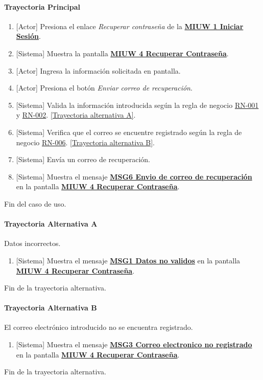 \paragraph{Trayectoria Principal}
	\begin{enumerate}
	    \item {[Actor]} Presiona el enlace \textit{Recuperar contraseña} de la \hyperref[fig:MIUW-1]{\bf MIUW 1 Iniciar Sesión}.
	    \item {[Sistema]} Muestra la pantalla \hyperref[fig:MIUW-4]{\bf MIUW 4 Recuperar Contraseña}.
	    \item {[Actor]} Ingresa la información solicitada en pantalla.
	    \item {[Actor]} Presiona el botón \textit{Enviar correo de recuperación}.
	    \item {[Sistema]} Valida la información introducida según la regla de negocio \hyperref[RN001]{RN-001} y \hyperref[RN002]{RN-002}. \hyperref[W-USR-CU3:TA]{[Trayectoria alternativa A]}.
	    \item {[Sistema]} Verifica que el correo se encuentre registrado según la regla de negocio \hyperref[RN006]{RN-006}. \hyperref[W-USR-CU3:TB]{[Trayectoria alternativa B]}.
	    \item {[Sistema]} Envía un correo de recuperación.
	    \item {[Sistema]} Muestra el mensaje \hyperref[MSG6]{\bf MSG6 Envio de correo de recuperación} en la pantalla \hyperref[fig:MIUW-4]{\bf MIUW 4 Recuperar Contraseña}.
	\end{enumerate}
	Fin del caso de uso.

\paragraph{Trayectoria Alternativa A} \label{W-USR-CU3:TA}
	Datos incorrectos.
	\begin{enumerate}[label=A\arabic*.]
		\item {[Sistema]} Muestra el mensaje \hyperref[MSG1]{\bf MSG1 Datos no validos} en la pantalla \hyperref[fig:MIUW-4]{\bf MIUW 4  Recuperar Contraseña}.
	\end{enumerate}
	Fin de la trayectoria alternativa.

\paragraph{Trayectoria Alternativa B} \label{W-USR-CU3:TB}
	El correo electrónico introducido no se encuentra registrado.
	\begin{enumerate}[label=B\arabic*.]
		\item {[Sistema]} Muestra el mensaje \hyperref[MSG3]{\bf MSG3 Correo electronico no registrado} en la pantalla \hyperref[fig:MIUW-4]{\bf MIUW 4 Recuperar Contraseña}.
	\end{enumerate}
	Fin de la trayectoria alternativa.